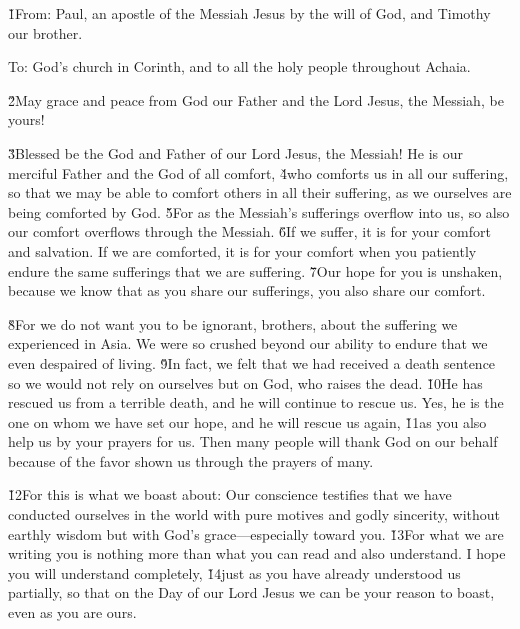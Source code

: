 


\v{1}From: Paul, an apostle of the Messiah Jesus by the will of God, and Timothy our brother.

To: God's church in Corinth, and to all the holy people throughout Achaia.

\v{2}May grace and peace from God our Father and the Lord Jesus, the Messiah, be yours!

\v{3}Blessed be the God and Father of our Lord Jesus, the Messiah! He is our merciful Father and the God of all comfort, \v{4}who comforts us in all our suffering, so that we may be able to comfort others in all their suffering, as we ourselves are being comforted by God. \v{5}For as the Messiah's sufferings overflow into us, so also our comfort overflows through the Messiah. \v{6}If we suffer, it is for your comfort and salvation. If we are comforted, it is for your comfort when you patiently endure the same sufferings that we are suffering. \v{7}Our hope for you is unshaken, because we know that as you share our sufferings, you also share our comfort.

\v{8}For we do not want you to be ignorant, brothers, about the suffering we experienced in Asia. We were so crushed beyond our ability to endure that we even despaired of living. \v{9}In fact, we felt that we had received a death sentence so we would not rely on ourselves but on God, who raises the dead. \v{10}He has rescued us from a terrible death, and he will continue to rescue us. Yes, he is the one on whom we have set our hope, and he will rescue us again, \v{11}as you also help us by your prayers for us. Then many people will thank God on our behalf because of the favor shown us through the prayers of many.

\v{12}For this is what we boast about: Our conscience testifies that we have conducted ourselves in the world with pure motives and godly sincerity, without earthly wisdom but with God's grace---especially toward you. \v{13}For what we are writing you is nothing more than what you can read and also understand. I hope you will understand completely, \v{14}just as you have already understood us partially, so that on the Day of our Lord Jesus we can be your reason to boast, even as you are ours.

